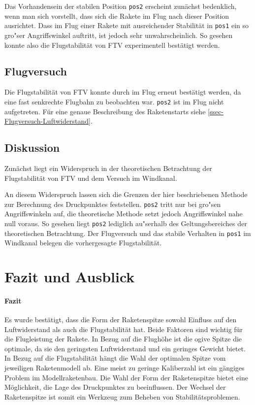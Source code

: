 \documentclass[10pt,a4paper]{article}
\begin{document}
Das Vorhandensein der stabilen Position \texttt{pos2} erscheint zunächst bedenklich, wenn man sich vorstellt, dass sich die Rakete im Flug nach dieser Position ausrichtet. Dass im Flug einer Rakete mit ausreichender Stabilität in \texttt{pos1} ein so gro"ser Angriffswinkel auftritt, ist jedoch sehr unwahrscheinlich. So gesehen konnte also die Flugstabilität von FTV experimentell bestätigt werden.


\subsection{Flugversuch}

Die Flugstabilität von FTV konnte durch im Flug erneut bestätigt werden, da eine fast senkrechte Flugbahn zu beobachten war. \texttt{pos2} ist im Flug nicht aufgetreten. Für eine genaue Beschreibung des Raketenstarts siehe \ref{ssec-Flugversuch-Luftwiderstand}.


\subsection{Diskussion}

Zunächst liegt ein Widerspruch in der theoretischen Betrachtung der Flugstabilität von FTV und dem Versuch im Windkanal.

An diesem Widerspruch lassen sich die Grenzen der hier beschriebenen Methode zur Berechnung des Druckpunktes feststellen. \texttt{pos2} tritt nur bei gro"sen Angriffswinkeln auf, die theoretische Methode setzt jedoch Angriffswinkel nahe null voraus. So gesehen liegt \texttt{pos2} lediglich au"serhalb des Geltungsbereiches der theoretischen Betrachtung. Der Flugversuch und das stabile Verhalten in \texttt{pos1} im Windkanal belegen die vorhergesagte Flugstabilität.



\section{Fazit und Ausblick}

\paragraph{Fazit}
Es wurde bestätigt, dass die Form der Raketenspitze sowohl Einfluss auf den Luftwiderstand als auch die Flugstabilität hat. Beide Faktoren sind wichtig für die Flugleistung der Rakete.
In Bezug auf die Flughöhe ist die ogive Spitze die optimale, da sie den geringsten Luftwiderstand und ein geringes Gewicht bietet.
In Bezug auf die Flugstabilität hängt die Wahl der optimalen Spitze vom jeweiligen Raketenmodell ab. Eine meist zu geringe Kaliberzahl ist ein gängiges Problem im Modellraketenbau. Die Wahl der Form der Raketenspitze bietet eine Möglichkeit, die Lage des Druckpunktes zu beeinflussen. Der Wechsel der Raketenspitze ist somit ein Werkzeug zum Beheben von Stabilitätsproblemen.
\end{document}

